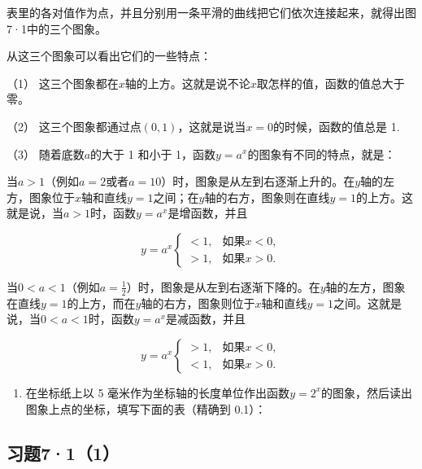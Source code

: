 表里的各对值作为点，并且分别用一条平滑的曲线把它们依次连接起来，就得出图7·1中的三个图象。

从这三个图象可以看出它们的一些特点：

（1）
这三个图象都在\(x\)轴的上方。这就是说不论\(x\)取怎样的值，函数的值总大于零。

（2）
这三个图象都通过点\((0, 1)\)，这就是说当\(x = 0\)的时候，函数的值总是 1.

（3） 随着底数\(a\)的大于 1 和小于
1，函数\(y = a^x\)的图象有不同的特点，就是：

当\(a > 1\)（例如\(a = 2\)或者\(a = 10\)）时，图象是从左到右逐渐上升的。在\(y\)轴的左方，图象位于\(x\)轴和直线\(y = 1\)之间；在\(y\)轴的右方，图象则在直线\(y = 1\)的上方。这就是说，当\(a > 1\)时，函数\(y = a^x\)是增函数，并且

\[
y = a^{x} \left\{ \begin{array}{ll} < 1, & \text{如果} x < 0, \\ > 1, & \text{如果} x > 0. \end{array} \right.
\]

当\(0 < a < 1\)（例如\(a = \frac{1}{2}\)）时，图象是从左到右逐渐下降的。在\(y\)轴的左方，图象在直线\(y = 1\)的上方，而在\(y\)轴的右方，图象则位于\(x\)轴和直线\(y = 1\)之间。这就是说，当\(0 < a < 1\)时，函数\(y=a^x\)是减函数，并且

\[
y = a^{x} \left\{ \begin{array}{ll} > 1, & \text{如果} x < 0, \\ < 1, & \text{如果} x > 0. \end{array} \right.
\]

\begin{enumerate}
\item
  在坐标纸上以 5
  毫米作为坐标轴的长度单位作出函数\(y = 2^x\)的图象，然后读出图象上点的坐标，填写下面的表（精确到
  0.1）：
\end{enumerate}

{\centering
\small\setlength{\tabcolsep}{3pt}%
\par
}

\subsection{习题7·1（1）}

